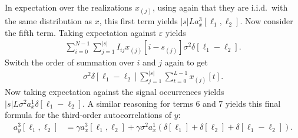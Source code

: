 \documentclass[12pt]{article}
\begin{document}
In expectation over the realizations $x_{(j)}$, using again that they are i.i.d.\ with the same distribution as $x$, this first term yields $|s|L a_x^3[\ell_1, \ell_2]$. Now consider the fifth term. Taking expectation against $\varepsilon$ yields
\begin{align}
	\sum_{i=0}^{N-1} \sum_{j = 1}^{|s|} I_{ij} x_{(j)}[i-s_{(j)}] \sigma^2 \delta[\ell_1 - \ell_2].
\end{align}
Switch the order of summation over $i$ and $j$ again to get
\begin{align}
	\sigma^2 \delta[\ell_1 - \ell_2] \sum_{j = 1}^{|s|} \sum_{t=0}^{L-1} x_{(j)}[t].
\end{align}
Now taking expectation against the signal occurrences yields $|s|L \sigma^2 a_x^1 \delta[\ell_1 - \ell_2]$. A similar reasoning for terms 6 and 7 yields this final formula for the third-order autocorrelations of $y$:
\begin{align}
	a_y^3[\ell_1, \ell_2] & = \gamma a_x^3[\ell_1, \ell_2] + \gamma \sigma^2 a_x^1 \left( \delta[\ell_1] + \delta[\ell_2] + \delta[\ell_1 - \ell_2] \right).
\end{align}
\end{document}
